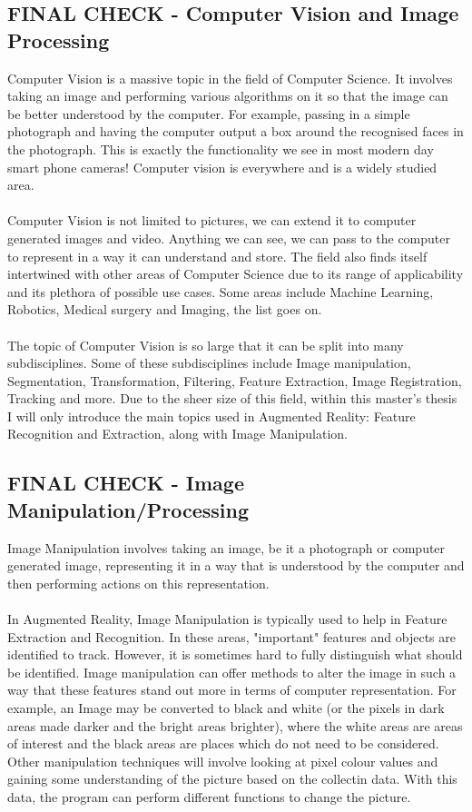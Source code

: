\documentclass[11pt]{article}
\begin{document}
\subsection{FINAL CHECK - Computer Vision and Image Processing}
Computer Vision is a massive topic in the field of Computer Science. It
involves taking an image and performing various algorithms on it so that
the image can be better understood by the computer. For example,
passing in a simple photograph and having the computer output a box
around the recognised faces in the photograph. This is exactly the
functionality we see in most modern day smart phone cameras! Computer
vision is everywhere and is a widely studied area.\\
\\
Computer Vision is not limited to pictures, we can extend it to 
computer generated images and video. Anything we can see, we can pass to 
the computer to represent in a way it can understand and
store. The field also finds itself intertwined with other areas of
Computer Science due to its range of applicability and its plethora
of possible use cases. Some areas include Machine Learning, Robotics,
Medical surgery and Imaging, the list goes on.\\
\\
The topic of Computer Vision is so large that it can be split into
many subdisciplines. Some of these subdisciplines include
Image manipulation, Segmentation, 
Transformation, Filtering, Feature Extraction, Image Registration,
Tracking and more. Due to the sheer size of this field, within 
this master's thesis I will only 
introduce the main topics used in Augmented Reality: Feature 
Recognition and Extraction, along with Image Manipulation.

\subsection{FINAL CHECK - Image Manipulation/Processing}
Image Manipulation involves taking an image, be it a photograph or 
computer generated image, representing it in a way that is understood
by the computer and then performing actions on this representation.\\
\\
In Augmented Reality, Image Manipulation is typically used to help in
Feature Extraction and Recognition. In these areas, "important" features and
objects are identified to track. However, it is sometimes hard to fully
distinguish what should be identified. Image manipulation can offer methods
to alter the image in such a way that these features stand out more in terms
of computer representation. For example, an Image may be converted to 
black and white
(or the pixels in dark areas made darker and the bright areas brighter),
where the white areas are areas of interest and the black areas are places
which do not need to be considered. Other manipulation techniques will
involve looking at pixel colour values and gaining some understanding of
the picture based on the collectin data. With this data, the program can
perform different functions to change the picture.
\end{document}
